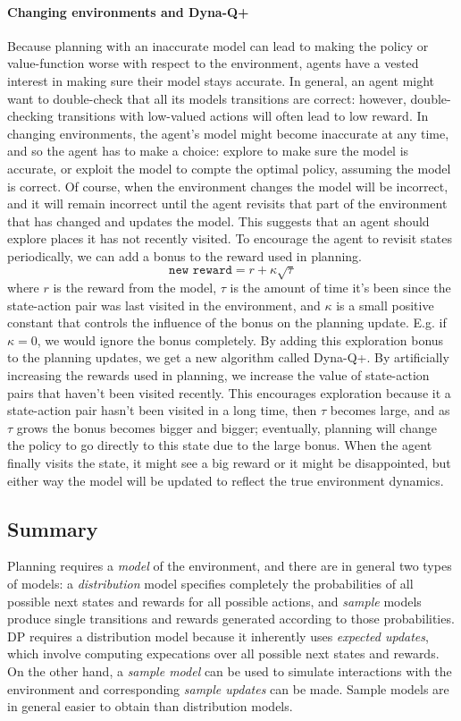 \documentclass[12pt]{article}
\begin{document}
\paragraph{Changing environments and Dyna-Q+}
Because planning with an inaccurate model can lead to making the policy or value-function worse with respect to the environment, agents have a vested interest in making sure their model stays accurate. In general, an agent might want to double-check that all its models transitions are correct: however, double-checking transitions with low-valued actions will often lead to low reward. In changing environments, the agent's model might become inaccurate at any time, and so the agent has to make a choice: explore to make sure the model is accurate, or exploit the model to compte the optimal policy, assuming the model is correct. Of course, when the environment changes the model will be incorrect, and it will remain incorrect until the agent revisits that part of the environment that has changed and updates the model. This suggests that an agent should explore places it has not recently visited. To encourage the agent to revisit states periodically, we can add a bonus to the reward used in planning.
\[
\texttt{new reward} = r + \kappa \sqrt{\tau}
\]
where $r$ is the reward from the model, $\tau$ is the amount of time it's been since the state-action pair was last visited in the environment, and $\kappa$ is a small positive constant that controls the influence of the bonus on the planning update. E.g. if $\kappa = 0$, we would ignore the bonus completely. By adding this exploration bonus to the planning updates, we get a new algorithm called Dyna-Q+. By artificially increasing the rewards used in planning, we increase the value of state-action pairs that haven't been visited recently. This encourages exploration because it a state-action pair hasn't been visited in a long time, then $\tau$ becomes large, and as $\tau$ grows the bonus becomes bigger and bigger; eventually, planning will change the policy to go directly to this state due to the large bonus. When the agent finally visits the state, it might see a big reward or it might be disappointed, but either way the model will be updated to reflect the true environment dynamics.

\subsection{Summary} Planning requires a \emph{model} of the environment, and there are in general two types of models: a \emph{distribution} model specifies completely the probabilities of all possible next states and rewards for all possible actions, and \emph{sample} models produce single transitions and rewards generated according to those probabilities. DP requires a distribution model because it inherently uses \emph{expected updates}, which involve computing expecations over all possible next states and rewards. On the other hand, a \emph{sample model} can be used to simulate interactions with the environment and corresponding \emph{sample updates} can be made. Sample models are in general easier to obtain than distribution models.
\end{document}
